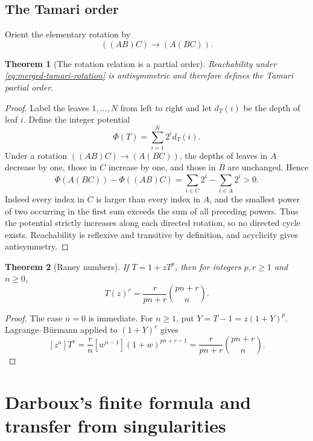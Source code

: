 \documentclass[11pt,a4paper,oneside,openany]{book}
\newtheorem{theorem}{Theorem}[chapter]
\theoremstyle{definition}
\theoremstyle{remark}
\begin{document}
\section{The Tamari order}

Orient the elementary rotation by
\begin{equation}
 ((AB)C)\longrightarrow(A(BC)).                                    \label{eq:merged-tamari-rotation}
\end{equation}

\begin{theorem}[The rotation relation is a partial order]
\label{thm:merged-tamari-order}
Reachability under \eqref{eq:merged-tamari-rotation} is antisymmetric and
therefore defines the Tamari partial order.
\end{theorem}

\begin{proof}
Label the leaves $1,\ldots,N$ from left to right and let $d_T(i)$ be the
depth of leaf $i$.  Define the integer potential
\[
 \Phi(T)=\sum_{i=1}^{N}2^i d_T(i).
\]
Under a rotation $((AB)C)\to(A(BC))$, the depths of leaves in $A$ decrease by
one, those in $C$ increase by one, and those in $B$ are unchanged.  Hence
\[
 \Phi(A(BC))-\Phi((AB)C)
 =\sum_{i\in C}2^i-\sum_{i\in A}2^i>0.
\]
Indeed every index in $C$ is larger than every index in $A$, and the smallest
power of two occurring in the first sum exceeds the sum of all preceding
powers.  Thus the potential strictly increases along each directed rotation,
so no directed cycle exists.  Reachability is reflexive and transitive by
definition, and acyclicity gives antisymmetry.
\end{proof}

\begin{theorem}[Raney numbers]
\label{thm:merged-raney}
If $T=1+zT^p$, then for integers $p,r\geq1$ and $n\geq0$,
\begin{equation}
 [z^n]T(z)^r=\frac{r}{pn+r}\binom{pn+r}{n}.                         \label{eq:merged-raney}
\end{equation}
\end{theorem}

\begin{proof}
The case $n=0$ is immediate.  For $n\geq1$, put
$Y=T-1=z(1+Y)^p$.  Lagrange--Bürmann applied to $(1+Y)^r$ gives
\[
 [z^n]T^r=\frac rn[w^{n-1}](1+w)^{pn+r-1}
 =\frac r{pn+r}\binom{pn+r}{n}.
\]
\end{proof}

\chapter{Darboux's finite formula and transfer from singularities}
\label{ch:merged-darboux}
\end{document}
